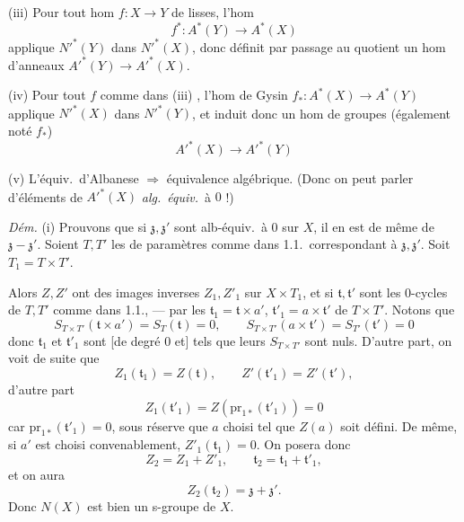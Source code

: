 \documentclass[11pt,a4paper]{article}
\begin{document}
(iii) Pour tout hom $f : X \to Y$ de 
 lisses, l'hom
\[
  f^{*} : A^{*}(Y) \to A^{*}(X)
\]
applique $N'^{*}(Y)$ dans $N'^{*}(X)$, donc définit par passage au quotient
un hom d'anneaux $A'^{*}(Y) \to A'^{*}(X)$.

(iv) Pour tout $f$ comme dans (iii) , l'hom de
Gysin $f_{*} : A^{*}(X) \to A^{*}(Y)$  applique $N'^{*}(X)$ dans
$N'^{*}(Y)$, et induit donc un hom de groupes (également noté $f_{*}$)
\[
  A'^{*}(X) \to A'^{*}(Y)
\]

(v) L'équiv.\ d'Albanese $\Rightarrow$ équivalence algébrique. (Donc on peut
parler d'éléments de $A'^{*}(X)$ \emph{alg.}\ \emph{équiv.}\ à $0$ !)

\emph{Dém.} (i)  Prouvons que si $\mathfrak{z}, \mathfrak{z}'$ sont
alb-équiv.\ à $0$ sur $X$, il en est de même de $\mathfrak{z} -
\mathfrak{z}'$. Soient $T, T'$ les  de paramètres comme
dans 1.1.\ correspondant à $\mathfrak{z}, \mathfrak{z}'$. Soit $T_{1} = T
\times T'$.

Alors $Z, Z'$ ont des images inverses $Z_{1}, Z'_{1}$ sur $X \times T_{1}$,
et si $\mathfrak{t}, \mathfrak{t}'$ sont les $0$-cycles de $T, T'$ comme dans
1.1., — par les \ill{}  $\mathfrak{t}_{1} = \mathfrak{t}
\times a'$, $\mathfrak{t}'_{1} = a \times \mathfrak{t}'$ de $T \times T'$.
Notons que
\[
  S_{T \times T'}(\mathfrak{t} \times a') = S_{T}(\mathfrak{t}) = 0, \qquad
  S_{T \times T'}(a \times \mathfrak{t}') = S_{T'}(\mathfrak{t}') = 0
\]
donc $\mathfrak{t}_{1}$ et $\mathfrak{t}'_{1}$ sont [de degré $0$ et]
 tels que leurs $S_{T \times T'}$ sont nuls. D'autre part,
on voit de suite que
\[
  Z_{1}(\mathfrak{t}_{1}) = Z(\mathfrak{t}), \qquad Z'(\mathfrak{t}'_{1}) =
  Z'(\mathfrak{t}'),
\]
 d'autre part
\[
  Z_{1}(\mathfrak{t}'_{1}) = Z(\mathrm{pr}_{1*}(\mathfrak{t}'_{1})) = 0
\]
car $\mathrm{pr}_{1*}(\mathfrak{t}'_{1}) = 0$, sous réserve que $a$
 choisi tel que $Z(a)$ soit défini. De même, si $a'$ est
choisi convenablement, $Z'_{1}(\mathfrak{t}_{1}) = 0$. On posera donc
\[
  Z_{2} = Z_{1} + Z'_{1}, \qquad \mathfrak{t}_{2} = \mathfrak{t}_{1} +
  \mathfrak{t}'_{1},
\]
et on aura
\[
  Z_{2}(\mathfrak{t}_{2}) = \mathfrak{z} + \mathfrak{z}' .
\]
\struck{\ill{}} Donc $N(X)$ est bien un s-groupe de $X$.
\end{document}
